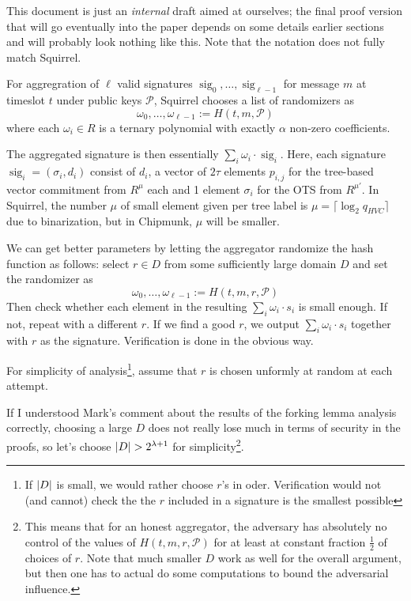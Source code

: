 \documentclass{article}
\newcommand{\sig}{\mathop{\textrm{sig}}}
\begin{document}
This document is just an \emph{internal} draft aimed at ourselves; the final proof version that will go eventually into the paper depends on some details earlier sections and will probably look nothing like this. Note that the notation does not fully match Squirrel.

For aggregration of $\ell$ valid signatures $\sig_0,\ldots, \sig_{\ell-1}$ for message $m$ at timeslot $t$ under public keys $\mathcal{P}$, Squirrel chooses a list of randomizers as
\[
\omega_0,\ldots, \omega_{\ell-1} := H(t, m, \mathcal{P})
\]
where each $\omega_i\in R$ is a ternary polynomial with exactly $\alpha$ non-zero coefficients.

The aggregated signature is then essentially $\sum_i \omega_i \cdot \sig_i$. Here, each signature $\sig_i = (\sigma_i, d_i)$ consist of $d_i$, a vector of $2\tau$ elements $p_{i,j}$ for the tree-based vector commitment from $R^{\mu}$ each and 1 element $\sigma_i$ for the OTS from $R^{\mu'}$.
In Squirrel, the number $\mu$ of small element given per tree label is $\mu = \lceil \log_2 q_{HVC}\rceil$ due to binarization, but in Chipmunk, $\mu$ will be smaller.

We can get better parameters by letting the aggregator randomize the hash function as follows: select $r\in D$ from some sufficiently large domain $D$ and set the randomizer as
\[
\omega_0, \ldots, \omega_{\ell-1} := H(t, m, r, \mathcal{P})
\]
Then check whether each element in the resulting $\sum_i \omega_i \cdot s_i$ is small enough. If not, repeat with a different $r$. If we find a good $r$, we output $\sum_i \omega_i \cdot s_i$ together with $r$ as the signature. Verification is done in the obvious way.

For simplicity of analysis\footnote{If ${\lvert{D}\rvert}$ is small, we would rather choose $r$'s in oder. Verification would not (and cannot) check the the $r$ included in a signature is the smallest possible}, assume that $r$ is chosen unformly at random at each attempt.

If I understood Mark's comment about the results of the forking lemma analysis correctly, choosing a large $D$ does not really lose much in terms of security in the proofs, so let's choose ${\lvert{D}\rvert} >2^{\lambda+1}$ for simplicity\footnote{This means that for an honest aggregator, the adversary has absolutely no control of the values of $H(t, m, r, \mathcal{P})$ for at least at constant fraction $\tfrac12$ of choices of $r$. Note that much smaller $D$ work as well for the overall argument, but then one has to actual do some computations to bound the adversarial influence.}.
\end{document}
